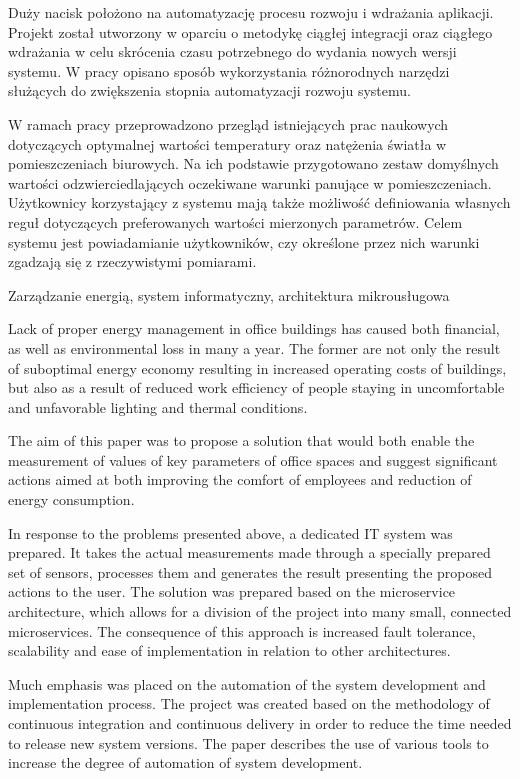 \documentclass[
    left=2.5cm,         %
    right=2.5cm,        %
    top=2.5cm,          %
    bottom=3cm,         %
    bindingoffset=6mm,  %
    nohyphenation=false %
]{eiti/eiti-thesis}
\begin{document}
Duży nacisk położono na automatyzację procesu rozwoju i wdrażania aplikacji. 
Projekt został utworzony w oparciu o metodykę ciągłej integracji oraz
ciągłego wdrażania w celu skrócenia czasu potrzebnego do wydania nowych
wersji systemu. W pracy opisano sposób wykorzystania różnorodnych narzędzi
służących do zwiększenia stopnia automatyzacji rozwoju systemu. 

W ramach pracy przeprowadzono przegląd istniejących prac naukowych 
dotyczących optymalnej wartości temperatury oraz natężenia światła w 
pomieszczeniach biurowych. Na ich podstawie przygotowano zestaw
domyślnych wartości odzwierciedlających oczekiwane warunki panujące w pomieszczeniach.
Użytkownicy korzystający z systemu mają także możliwość definiowania własnych reguł
dotyczących preferowanych wartości mierzonych parametrów. Celem systemu jest
powiadamianie użytkowników, czy określone przez nich warunki zgadzają się
z rzeczywistymi pomiarami.

\slowakluczowe Zarządzanie energią, system informatyczny, architektura mikrousługowa

\newpage
\abstract
Lack of proper energy management in office buildings has caused both 
financial, as well as environmental loss in many a year. The former are not only
the result of suboptimal energy economy resulting in increased operating
costs of buildings, but also as a result of reduced work efficiency of people
staying in uncomfortable and unfavorable lighting and thermal conditions.

The aim of this paper was to propose a solution that would both enable the measurement of
values of key parameters of office spaces and suggest significant actions
aimed at both improving the comfort of employees and reduction of energy
consumption.

In response to the problems presented above, a dedicated IT system was prepared. 
It takes the actual measurements made
through a specially prepared set of sensors, processes them and generates
the result presenting the proposed actions to the user.
The solution was prepared based on the microservice architecture, which
allows for a division of the project into many small, connected microservices.
The consequence of this approach is increased fault tolerance, scalability
and ease of implementation in relation to other architectures.

Much emphasis was placed on the automation of the system development and implementation process.
The project was created based on the methodology of continuous integration and
continuous delivery in order to reduce the time needed to release new
system versions. The paper describes the use of various tools
to increase the degree of automation of system development.
\end{document}
